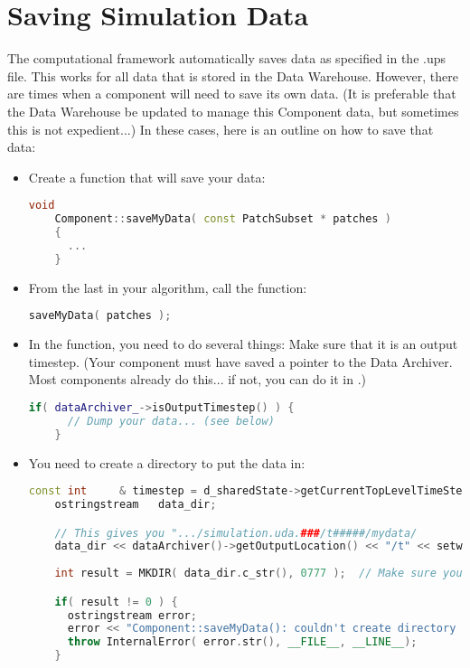 \section{Saving Simulation Data}
The computational framework automatically saves data as specified in the .ups file.  This
works for all data that is stored in the Data Warehouse.  However,
there are times when a component will need to save its own data.  (It
is preferable that the Data Warehouse be updated to manage this
Component data, but sometimes this is not expedient...)  In these
cases, here is an outline on how to save that data:

\begin{itemize}
\item Create a function that will save your data:
  \begin{lstlisting}[language=Cpp]
    void
    Component::saveMyData( const PatchSubset * patches )
    {
      ...
    }
  \end{lstlisting}
\item From the last  in your algorithm, call the function:
  \begin{lstlisting}[language=Cpp]
    saveMyData( patches );
  \end{lstlisting}
\item In the function, you need to do several things:
  Make sure that it is an output timestep.  (Your component must have
  saved a pointer to the Data Archiver.  Most components already do
  this... if not, you can do it in .)
  \begin{lstlisting}[language=Cpp]
    if( dataArchiver_->isOutputTimestep() ) {
      // Dump your data... (see below)
    }
  \end{lstlisting}

\item You need to create a directory to put the data in:
  \begin{lstlisting}[language=Cpp]
    const int     & timestep = d_sharedState->getCurrentTopLevelTimeStep();
    ostringstream   data_dir;

    // This gives you ".../simulation.uda.###/t#####/mydata/
    data_dir << dataArchiver()->getOutputLocation() << "/t" << setw(5) << setfill('0') << timestep << "/mydata";
    
    int result = MKDIR( data_dir.c_str(), 0777 );  // Make sure you #include <Core/OS/Dir.h>

    if( result != 0 ) {
      ostringstream error;
      error << "Component::saveMyData(): couldn't create directory '") + data_dir.str() + "' (" << result << ").";
      throw InternalError( error.str(), __FILE__, __LINE__);        
    }
  \end{lstlisting}


\end{itemize}
